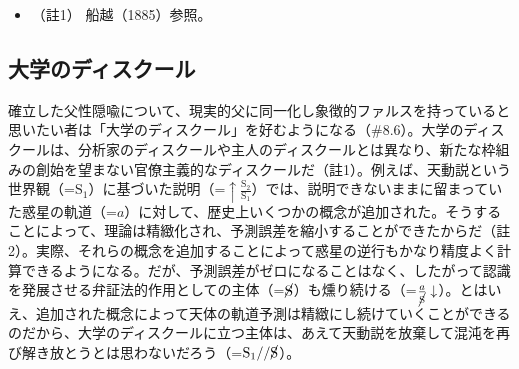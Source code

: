 \begin{itemize}
\tightlist
\item
  （註1） 船越（1885）\cite{Funakoshi}参照。
\end{itemize}

\subsection{大学のディスクール}\label{ux5927ux5b66ux306eux30c7ux30a3ux30b9ux30afux30fcux30eb}

確立した父性隠喩について、現実的父に同一化し象徴的ファルスを持っていると思いたい者は「\mbox{大学のディスクール}」を好むようになる（\#8.6）。\mbox{大学のディスクール}は、\mbox{分析家のディスクール}や\mbox{主人のディスクール}とは異なり、新たな枠組みの創始を望まない官僚主義的なディスクールだ（註1）。例えば、天動説という世界観（=\(\textrm{S}_1\)）に基づいた説明（=\(\uparrow\frac{\textrm{S}_2}{\textrm{S}_1}\)）では、説明できないままに留まっていた惑星の軌道（=\(a\)）に対して、歴史上いくつかの概念が追加された。そうすることによって、理論は精緻化され、\mbox{予測誤差}を縮小することができたからだ（註2）。実際、それらの概念を追加することによって惑星の逆行もかなり精度よく計算できるようになる。だが、\mbox{予測誤差}がゼロになることはなく、したがって認識を発展させる\mbox{弁証法}的作用としての主体（=\(\cancel{\textrm{S}}\)）も燻り続ける（=\(\frac{a}{\cancel{\textrm{S}}}\downarrow\)）。とはいえ、追加された概念によって天体の軌道予測は精緻にし続けていくことができるのだから、\mbox{大学のディスクール}に立つ主体は、あえて天動説を放棄して混沌を再び解き放とうとは思わないだろう（=\(\textrm{S}_1//\cancel{\textrm{S}}\)）。

